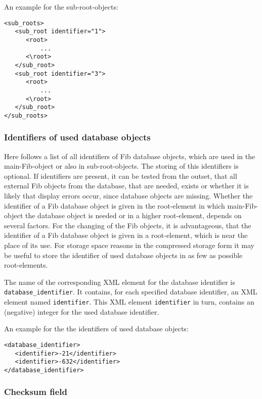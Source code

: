 \bigskip\noindent
An example for the sub-root-objects:
\begin{verbatim}
<sub_roots>
   <sub_root identifier="1">
      <root>
          ...
      <\root>
   </sub_root>
   <sub_root identifier="3">
      <root>
          ...
      <\root>
   </sub_root>
</sub_roots>
\end{verbatim}


\subsubsection{Identifiers of used database objects}
\label{secXmlRootDBIdentifier}

Here follows a list of all identifiers of Fib database objects, which are used in the main-Fib-object or also in sub-root-objects. The storing of this identifiers is optional. If identifiers are present, it can be tested from the outset, that all external Fib objects from the database, that are needed, exists or whether it is likely that display errors occur, since database objects are missing. Whether the identifier of a Fib database object is given in the root-element in which main-Fib-object the database object is needed or in a higher root-element, depends on several factors. For the changing of the Fib objects, it is advantageous, that the identifier of a Fib database object is given in a root-element, which is near the place of its use. For storage space reasons in the compressed storage form it may be useful to store the identifier of used database objects in as few as possible root-elements.

The name of the corresponding XML element for the database identifier is \verb|database_identifier|. It contains, for each specified database identifier, an XML element named \verb|identifier|. This XML element \verb|identifier| in turn, contains an (negative) integer for the used database identifier.

\bigskip\noindent
An example for the the identifiers of used database objects:
\begin{verbatim}
<database_identifier>
   <identifier>-21</identifier>
   <identifier>-632</identifier>
</database_identifier>
\end{verbatim}


\subsubsection{Checksum field}
\label{secXmlRootChecksumm}

